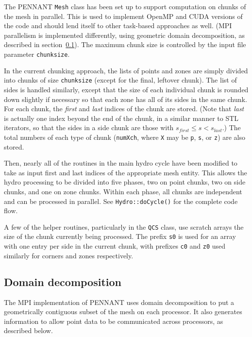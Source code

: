 \documentclass[11pt,letterpaper]{article}
\begin{document}
The PENNANT {\tt Mesh} class has been set up to support computation on
chunks of the mesh in parallel.  This is used to implement OpenMP and CUDA
versions of the code and should lend itself to other task-based approaches
as well.  (MPI parallelism is implemented differently, using geometric
domain decomposition, as described in section~\ref{sec:domain}).
The maximum chunk size is controlled by the input file parameter
{\tt chunksize}.

In the current chunking approach, the lists of points and zones are
simply divided into chunks of size {\tt chunksize} (except for the final,
leftover chunk).  The list of sides is handled similarly, except that
the size of each individual chunk is rounded down slightly if necessary
so that each zone has all of its sides in the same chunk.  For each chunk,
the {\em first} and {\em last} indices of the chunk are stored.
(Note that {\em last} is actually one index beyond the end of the chunk,
in a similar manner to STL iterators, so that the sides in a side chunk
are those with $s_{first} \le s < s_{last}$.)  The total numbers of each
type of chunk ({\tt numXch}, where {\tt X} may be {\tt p}, {\tt s}, or
{\tt z}) are also stored.

Then, nearly all of the routines in the main hydro cycle have been
modified to take as input first and last indices of the appropriate
mesh entity.  This allows the hydro processing to be divided into
five phases, two on point chunks, two on side chunks, and one on zone
chunks.  Within each phase, all chunks are independent and can be
processed in parallel.
See {\tt Hydro::doCycle()} for the complete code flow.

A few of the helper routines, particularly in the {\tt QCS} class,
use scratch arrays the size of the chunk currently being processed.
The prefix {\tt s0} is used for an array with one entry per side
in the current chunk, with prefixes {\tt c0} and {\tt z0} used similarly
for corners and zones respectively.

\subsection{Domain decomposition}
\label{sec:domain}

The MPI implementation of PENNANT uses domain decomposition to put
a geometrically contiguous subset of the mesh on each processor.
It also generates information to allow point data to be communicated
across processors, as described below.
\end{document}
